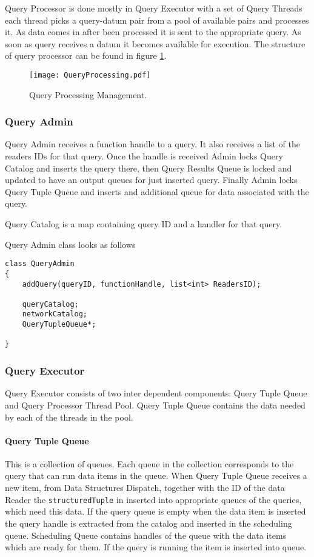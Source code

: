 \documentclass[11pt]{article}
\begin{document}
Query Processor is done mostly in Query Executor with a set of Query Threads each thread picks a query-datum pair from a pool of available pairs and processes it. As data comes in after been processed it is sent to the appropriate query. As soon as query receives a datum it becomes available for execution. The structure of query processor can be found in figure \ref{QueryProcessingPic}.

\begin{figure}
  \texttt{[image: QueryProcessing.pdf]}
  \caption{Query Processing Management.}
  \label{QueryProcessingPic}
\end{figure}

\subsubsection{Query Admin}

Query Admin receives a function handle to a query. It also receives a list of the readers IDs for that query. Once the handle is received Admin locks Query Catalog and inserts the query there, then Query Results Queue is locked and updated to have an output queues for just inserted query. Finally Admin locks Query Tuple Queue and inserts and additional queue for data associated with the query. 

Query Catalog is a map containing query ID and a handler for that query. 

Query Admin class looks as follows
\begin{verbatim}
class QueryAdmin
{
    addQuery(queryID, functionHandle, list<int> ReadersID);

	queryCatalog;
	networkCatalog;
	QueryTupleQueue*;
	
}
\end{verbatim}

\subsubsection{Query Executor}

Query Executor consists of two inter dependent components: Query Tuple Queue and Query Processor Thread Pool. Query Tuple Queue contains the data needed by each of the threads in the pool. 

\paragraph{Query Tuple Queue}

This is a collection of queues. Each queue in the collection corresponds to the query that can run data items in the queue. When Query Tuple Queue receives a new item, from Data Structures Dispatch, together with the ID of the data Reader the {\tt structuredTuple} in inserted into appropriate queues of the queries, which need this data.  If the query queue is empty when the data item is inserted the query handle is extracted from the catalog and inserted in the scheduling queue. Scheduling Queue contains handles of the queue with the data items which are ready for them. If the query is running the item is inserted into queue.
\end{document}
